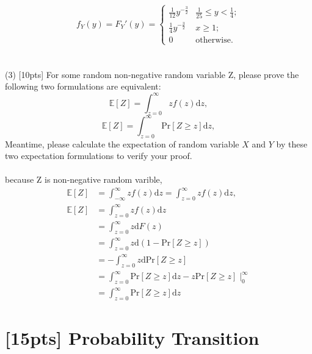 \documentclass{article}
\begin{document}
\begin{equation}
    f_Y(y)=F_Y'(y)=\begin{cases}
        \frac{1}{12} y^{-\frac{3}{2}} & \frac{1}{25} \leq y < \frac{1}{4};\\
        \frac{1}{4} y^{-\frac{3}{2}} & x \geq 1;\\
        0 & \text{otherwise}.
    \end{cases}
\end{equation}
\\ \\
(3) [10pts] For some random non-negative random variable Z, please prove the following two formulations are equivalent:\\
\begin{equation}
\mathbb{E}[Z]=\int^\infty_{z=0} z f(z)\mathrm{d}z,
\end{equation}
\begin{equation}
\mathbb{E}[Z]=\int^\infty_{z=0} \mathrm{Pr}[Z\geq z]\mathrm{d}z,
\end{equation}
Meantime, please calculate the expectation of random variable $X$ and $Y$ by these two expectation formulations to verify your proof.
\\ \\because Z is non-negative random varible,
\begin{equation}
\begin{aligned}
\mathbb{E}[Z]&=\int^\infty_{-\infty} z f(z)\mathrm{d}z=\int^\infty_{z=0} z f(z)\mathrm{d}z, 
\\\mathbb{E}[Z]&=\int^\infty_{z=0} z f(z)\mathrm{d}z
\\&=\int^\infty_{z=0} z \mathrm{d}F(z)
\\&=\int^\infty_{z=0} z \mathrm{d}(1-\mathrm{Pr}[Z\geq z])
\\&=-\int^\infty_{z=0} z \mathrm{d}\mathrm{Pr}[Z\geq z]
\\&=\int^\infty_{z=0} \mathrm{Pr}[Z\geq z]\mathrm{d}z - z\mathrm{Pr}[Z\geq z]{\mid}_0^{\infty}
\\&=\int^\infty_{z=0} \mathrm{Pr}[Z\geq z]\mathrm{d}z
\end{aligned}
\end{equation}

\section{[15pts] Probability Transition}
\end{document}
